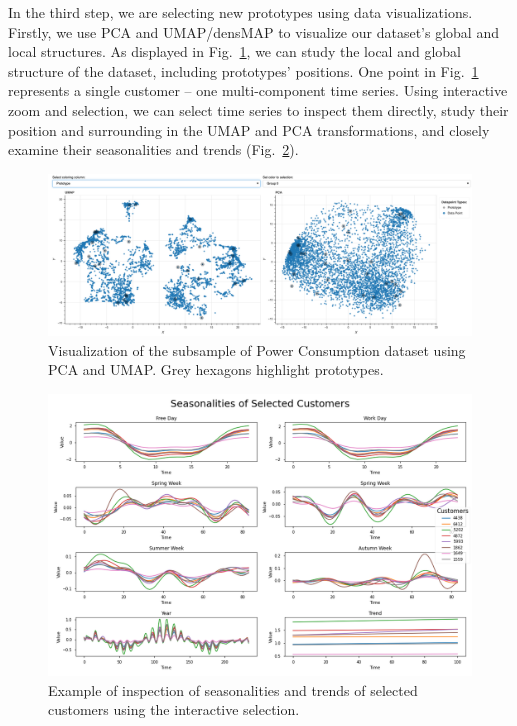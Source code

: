 In the third step, we are selecting new prototypes using data visualizations. Firstly, we use PCA and UMAP/densMAP to visualize our dataset's global and local structures. As displayed in Fig.~\ref{fig:prototypes}, we can study the local and global structure of the dataset, including prototypes' positions. One point in Fig.~\ref{fig:prototypes} represents a single customer -- one multi-component time series. Using interactive zoom and selection, we can select time series to inspect them directly, study their position and surrounding in the UMAP and PCA transformations, and closely examine their seasonalities and trends (Fig.~\ref{fig:selected-seasonalities}). 
\begin{figure}[h]
    \centering
    \includegraphics[width=\textwidth]{img/prototypes.png}
    \caption{Visualization of the subsample of Power Consumption dataset using PCA and UMAP. Grey hexagons highlight prototypes.}
    \label{fig:prototypes}
\end{figure}
\begin{figure}[h]
    \centering
    \includegraphics[width=\textwidth]{img/selected-seasonalities.png}
    \caption{Example of inspection of seasonalities and trends of selected customers using the interactive selection.}
    \label{fig:selected-seasonalities}
\end{figure}

